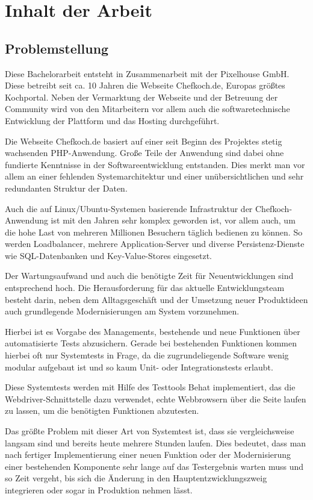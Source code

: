 \section{Inhalt der Arbeit}

\subsection{Problemstellung}

Diese Bachelorarbeit entsteht in Zusammenarbeit mit der Pixelhouse GmbH. Diese betreibt seit ca. 10 Jahren die Webseite Chefkoch.de, Europas größtes Kochportal. Neben der Vermarktung der Webseite und der Betreuung der Community wird von den Mitarbeitern vor allem auch die softwaretechnische Entwicklung der Plattform und das Hosting durchgeführt.

Die Webseite Chefkoch.de basiert auf einer seit Beginn des Projektes stetig wachsenden PHP-Anwendung. Große Teile der Anwendung sind dabei ohne fundierte Kenntnisse in der Softwareentwicklung entstanden. Dies merkt man vor allem an einer fehlenden Systemarchitektur und einer unübersichtlichen und sehr redundanten Struktur der Daten.

Auch die auf Linux/Ubuntu-Systemen basierende Infrastruktur der Chefkoch-Anwendung ist mit den Jahren sehr komplex geworden ist, vor allem auch, um die hohe Last von mehreren Millionen Besuchern täglich bedienen zu können. So werden Loadbalancer, mehrere Application-Server und diverse Persistenz-Dienste wie SQL-Datenbanken und Key-Value-Stores eingesetzt.

Der Wartungsaufwand und auch die benötigte Zeit für Neuentwicklungen sind entsprechend hoch. Die Herausforderung für das aktuelle Entwicklungsteam besteht darin, neben dem Alltagsgeschäft und der Umsetzung neuer Produktideen auch grundlegende Modernisierungen am System vorzunehmen.

Hierbei ist es Vorgabe des Managements, bestehende und neue Funktionen über automatisierte Tests abzusichern. Gerade bei bestehenden Funktionen kommen hierbei oft nur Systemtests in Frage, da die zugrundeliegende Software wenig modular aufgebaut ist und so kaum Unit- oder Integrationstests erlaubt.

Diese Systemtests werden mit Hilfe des Testtools Behat implementiert, das die Webdriver-Schnittstelle dazu verwendet, echte Webbrowsern über die Seite laufen zu lassen, um die benötigten Funktionen abzutesten.

Das größte Problem mit dieser Art von Systemtest ist, dass sie vergleichsweise langsam sind und bereits heute mehrere Stunden laufen. Dies bedeutet, dass man nach fertiger Implementierung einer neuen Funktion oder der Modernisierung einer bestehenden Komponente sehr lange auf das Testergebnis warten muss und so Zeit vergeht, bis sich die Änderung in den Hauptentzwicklungszweig integrieren oder sogar in Produktion nehmen lässt.

